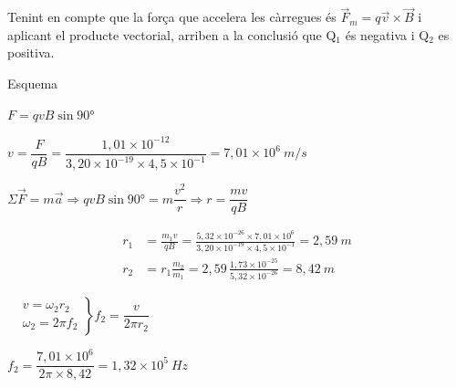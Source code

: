 \begin{solapartat}
Tenint en compte que la força que accelera les càrregues és $\vec{F}_m = q\vec{v}\times\vec{B}$  i aplicant el producte vectorial, arriben a la conclusió que Q$_1$ és negativa i Q$_2$ es positiva.

Esquema 


 $F = qvB\sin 90°$

 $v = \dfrac{F}{qB} = \dfrac{1,01\times 10^{-12}}{3,20\times 10^{-19}\times 4,5\times 10^{-1}} = 7,01\times 10^{6}\ m/s$
\end{solapartat}

\begin{solapartat}
 $\Sigma\vec{F} = m\vec{a} \Rightarrow qvB\sin 90° = m\dfrac{v^2}{r} \Rightarrow r = \dfrac{mv}{qB}$

\begin{align*}
r_1 &= \frac{m_1v}{qB} = \frac{5,32\times 10^{-26}\times 7,01\times 10^{6}}{3,20\times 10^{-19}\times 4,5\times 10^{-1}} = 2,59\ m\\
r_2 &= r_1\frac{m_2}{m_1} = 2,59\,\frac{1,73\times 10^{-25}}{5,32\times 10^{-26}} = 8,42\ m
\end{align*}

 $\left.\begin{aligned} &v = \omega_2r_2\\ &\omega_2 = 2\pi f_2\end{aligned}\right\} f_2 = \dfrac{v}{2\pi r_2}$

 $f_2 = \dfrac{7,01\times 10^{6}}{2\pi\times 8,42} = 1,32\times 10^{5}\ Hz$
\end{solapartat}
